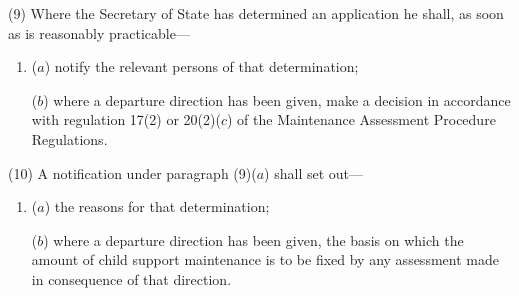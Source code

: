 \documentclass[12pt,a4paper]{article}
\begin{document}
%
%

(9) Where the Secretary of State has determined an application he shall, as soon
as is reasonably practicable—
\begin{enumerate}\item[]
($a$) notify the relevant persons of that determination;

($b$) where a departure direction has been given, 
make a decision in accordance with regulation 17(2) or 20(2)($c$) of the Maintenance Assessment Procedure Regulations.  %
\end{enumerate}

(10) A notification under paragraph (9)($a$) shall set out—
\begin{enumerate}\item[]
($a$) the reasons for that determination;

($b$) where a departure direction has been given, the basis on which the amount of
child support maintenance is to be fixed by any assessment made in consequence
of that direction.
\end{enumerate}
\end{document}
